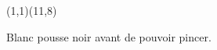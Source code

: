 \documentclass[preview, border=0pt, varwidth=false]{standalone}
\begin{document}
	\setgounit{0.6cm} 
	
\parbox[c][14.65cm][c]{10.2cm}{
	\centering
		
	\begin{psgopartialboard}{(1,1)(11,8)}
		\pass
	\end{psgopartialboard}
	
	\vspace{1em}
	Blanc pousse noir avant de pouvoir pincer.
	}
\end{document}
